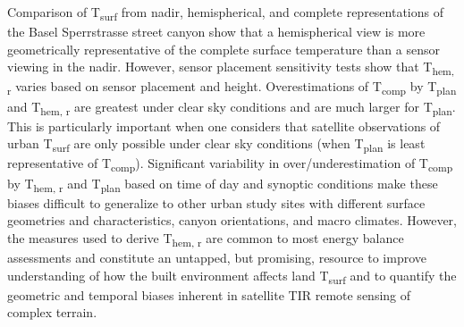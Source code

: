 \begin{bibunit}
Comparison of T\textsubscript{surf} from nadir, hemispherical, and complete representations of the Basel Sperrstrasse street canyon show that a hemispherical view is more geometrically representative of the complete surface temperature than a sensor viewing in the nadir. However, sensor placement sensitivity tests show that T\textsubscript{hem, r} varies based on sensor placement and height. Overestimations of T\textsubscript{comp} by T\textsubscript{plan} and T\textsubscript{hem, r} are greatest under clear sky conditions and are much larger for T\textsubscript{plan}. This is particularly important when one considers that satellite observations of urban T\textsubscript{surf} are only possible under clear sky conditions (when T\textsubscript{plan} is least representative of T\textsubscript{comp}). Significant variability in over/underestimation of T\textsubscript{comp} by T\textsubscript{hem, r} and T\textsubscript{plan} based on time of day and synoptic conditions make these biases difficult to generalize to other urban study sites with different surface geometries and characteristics, canyon orientations, and macro climates. However, the measures used to derive T\textsubscript{hem, r} are common to most energy balance assessments and constitute an untapped, but promising, resource to improve understanding of how the built environment affects land T\textsubscript{surf} and to quantify the geometric and temporal biases inherent in satellite TIR remote sensing of complex terrain. 

\cleardoublepage 
{}  
\renewcommand*{\bibname}{References}

\putbib
\end{bibunit}
